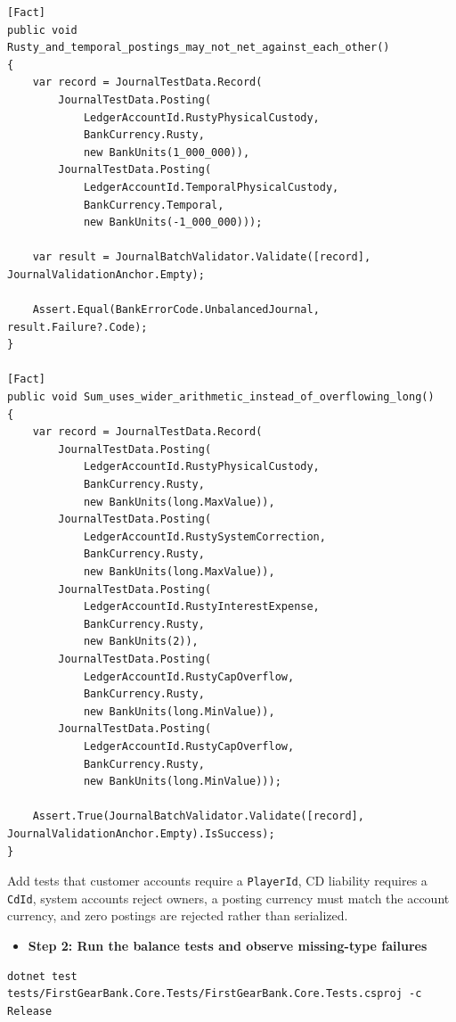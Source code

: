 \documentclass[
  10pt,
  letterpaper,
]{article}
\newcommand{\passthrough}[1]{#1}
\providecommand{\tightlist}{%
  \setlength{\itemsep}{0pt}\setlength{\parskip}{0pt}}
\begin{document}
\begin{lstlisting}
[Fact]
public void Rusty_and_temporal_postings_may_not_net_against_each_other()
{
    var record = JournalTestData.Record(
        JournalTestData.Posting(
            LedgerAccountId.RustyPhysicalCustody,
            BankCurrency.Rusty,
            new BankUnits(1_000_000)),
        JournalTestData.Posting(
            LedgerAccountId.TemporalPhysicalCustody,
            BankCurrency.Temporal,
            new BankUnits(-1_000_000)));

    var result = JournalBatchValidator.Validate([record], JournalValidationAnchor.Empty);

    Assert.Equal(BankErrorCode.UnbalancedJournal, result.Failure?.Code);
}

[Fact]
public void Sum_uses_wider_arithmetic_instead_of_overflowing_long()
{
    var record = JournalTestData.Record(
        JournalTestData.Posting(
            LedgerAccountId.RustyPhysicalCustody,
            BankCurrency.Rusty,
            new BankUnits(long.MaxValue)),
        JournalTestData.Posting(
            LedgerAccountId.RustySystemCorrection,
            BankCurrency.Rusty,
            new BankUnits(long.MaxValue)),
        JournalTestData.Posting(
            LedgerAccountId.RustyInterestExpense,
            BankCurrency.Rusty,
            new BankUnits(2)),
        JournalTestData.Posting(
            LedgerAccountId.RustyCapOverflow,
            BankCurrency.Rusty,
            new BankUnits(long.MinValue)),
        JournalTestData.Posting(
            LedgerAccountId.RustyCapOverflow,
            BankCurrency.Rusty,
            new BankUnits(long.MinValue)));

    Assert.True(JournalBatchValidator.Validate([record], JournalValidationAnchor.Empty).IsSuccess);
}
\end{lstlisting}

Add tests that customer accounts require a
\passthrough{\lstinline!PlayerId!}, CD liability requires a
\passthrough{\lstinline!CdId!}, system accounts reject owners, a posting
currency must match the account currency, and zero postings are rejected
rather than serialized.

\begin{itemize}
\tightlist
\item[$\square$]
  \textbf{Step 2: Run the balance tests and observe missing-type
  failures}
\end{itemize}

\begin{lstlisting}
dotnet test tests/FirstGearBank.Core.Tests/FirstGearBank.Core.Tests.csproj -c Release
\end{lstlisting}
\end{document}
